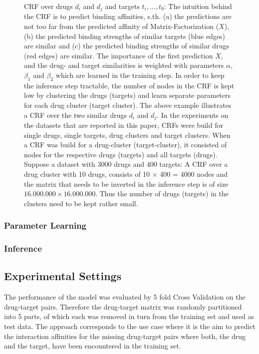 \documentclass[
journal=jacsat, %
manuscript=article]{achemso}
\begin{document}
\begin{figure}
\caption{CRF over drugs $d_i$ and $d_j$ and targets $t_i,\dots,t_9$:  The intuition behind the CRF is to predict binding affinities, s.th. (a) the predictions are not too far from the predicted affinity of Matrix-Factorization ($X$), (b) the predicted binding strengths of similar targets (blue edges) are similar and (c) the predicted  binding strengths of similar drugs (red edges) are similar. The importance of the first prediction $X$, and the drug- and target similarities is weighted with parameters $\alpha$, $\beta_1$ and $\beta_2$ which are learned in the training step. In order to keep the inference step tractable, the number of nodes in the CRF is kept low by clustering the drugs (targets) and learn separate parameters for each drug cluster (target cluster). The above example illustrates a CRF over the two similar drugs $d_i$ and $d_j$. In the experiments on the datasets that are reported in this paper, CRFs were build for single drugs, single targets, drug clusters and target clusters. When a CRF was build for a drug-cluster (target-cluster), it consisted of nodes for the respective drugs (targets) and all targets (drugs). Suppose a dataset with 3000 drugs and 400 targets: A CRF over a drug cluster with 10 drugs, consists of 10 $\times$ 400  = 4000 nodes and the matrix that needs to be inverted in the inference step is of size $16.000.000 \times 16.000.000$. Thus the number of drugs (targets) in the clusters need to be kept rather small.
}
\end{figure}

\subsubsection{Parameter Learning}

\subsubsection{Inference}

\subsection{Experimental Settings}
The performance of the model was evaluated by 5 fold Cross Validation on the drug-target pairs. Therefore the drug-target matrix was randomly partitioned into 5 parts, of which each was removed in turn from the training set and used as test data. The approach corresponds to the use case where it is the aim to predict the interaction affinities for the missing drug-target pairs where both, the drug and the target, have been encountered in the training set.
\end{document}
